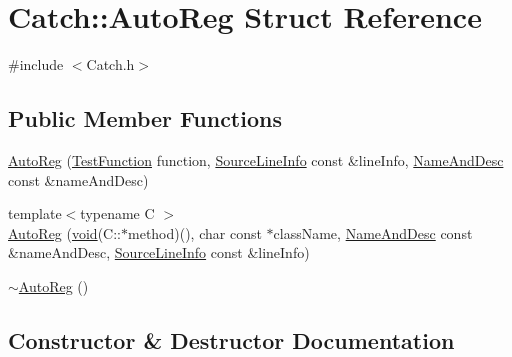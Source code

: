 \hypertarget{struct_catch_1_1_auto_reg}{}\section{Catch\+:\+:Auto\+Reg Struct Reference}
\label{struct_catch_1_1_auto_reg}


{\ttfamily \#include $<$Catch.\+h$>$}

\subsection*{Public Member Functions}
\begin{DoxyCompactItemize}
\item 
\hyperlink{struct_catch_1_1_auto_reg_af224f4568d57b8652474df475a164a8c}{Auto\+Reg} (\hyperlink{namespace_catch_a26414f52d0835939fae52aadd27e6257}{Test\+Function} function, \hyperlink{struct_catch_1_1_source_line_info}{Source\+Line\+Info} const \&line\+Info, \hyperlink{struct_catch_1_1_name_and_desc}{Name\+And\+Desc} const \&name\+And\+Desc)
\item 
{\footnotesize template$<$typename C $>$ }\\\hyperlink{struct_catch_1_1_auto_reg_a1bf9207fe0a02b46dc0ab1cc03cbe738}{Auto\+Reg} (\hyperlink{_s_d_l__opengles2__gl2ext_8h_ae5d8fa23ad07c48bb609509eae494c95}{void}(C\+::$\ast$method)(), char const $\ast$class\+Name, \hyperlink{struct_catch_1_1_name_and_desc}{Name\+And\+Desc} const \&name\+And\+Desc, \hyperlink{struct_catch_1_1_source_line_info}{Source\+Line\+Info} const \&line\+Info)
\item 
\hyperlink{struct_catch_1_1_auto_reg_a3cdb53f1e5ff115310f3372bebe198f1}{$\sim$\+Auto\+Reg} ()
\end{DoxyCompactItemize}


\subsection{Constructor \& Destructor Documentation}
